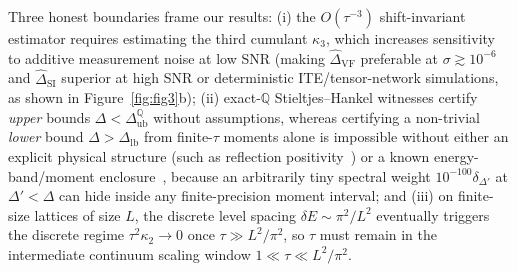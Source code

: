 \documentclass[11pt,a4paper]{article}
\theoremstyle{definition}
\newcommand{\Q}{\mathbb{Q}}
\begin{document}
Three honest boundaries frame our results: (i) the $O(\tau^{-3})$ shift-invariant estimator requires estimating the third cumulant $\kappa_3$, which increases sensitivity to additive measurement noise at low SNR (making $\widehat{\Delta}_{\mathrm{VF}}$ preferable at $\sigma \gtrsim 10^{-6}$ and $\widehat{\Delta}_{\mathrm{SI}}$ superior at high SNR or deterministic ITE/tensor-network simulations, as shown in Figure~\ref{fig:fig3}b); (ii) exact-$\Q$ Stieltjes--Hankel witnesses certify \emph{upper} bounds $\Delta < \Delta_{\mathrm{ub}}^{\Q}$ without assumptions, whereas certifying a non-trivial \emph{lower} bound $\Delta > \Delta_{\mathrm{lb}}$ from finite-$\tau$ moments alone is impossible without either an explicit physical structure (such as reflection positivity~\cite{Antigravity2026Purity}) or a known energy-band/moment enclosure~\cite{Antigravity2026QCQMC}, because an arbitrarily tiny spectral weight $10^{-100}\delta_{\Delta'}$ at $\Delta' < \Delta$ can hide inside any finite-precision moment interval; and (iii) on finite-size lattices of size $L$, the discrete level spacing $\delta E \sim \pi^2/L^2$ eventually triggers the discrete regime $\tau^2\kappa_2 \to 0$ once $\tau \gg L^2/\pi^2$, so $\tau$ must remain in the intermediate continuum scaling window $1 \ll \tau \ll L^2/\pi^2$.



\end{document}
